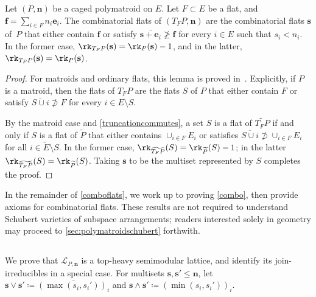 \begin{lemm}\label{truncation}
  Let $(P, \mathbf n)$ be a caged polymatroid on $E$.
  Let $F \subset E$ be a flat, and $\mathbf f = \sum_{i \in F} n_i \mathbf e_i$.
  The combinatorial flats of $(T_F P, \mathbf n)$ are the combinatorial flats $\mathbf s$ of~$P$ that either contain $\mathbf f$ or satisfy  $\overline{\mathbf s +  \mathbf e_i} \not \geq \mathbf f$ for every $i \in E$ such that $s_i < n_i$.
  In the former case, $\rk_{T_FP}(\mathbf s) = \rk_P(\mathbf s) - 1$, and in the latter, $\rk_{T_FP}(\mathbf s) = \rk_P(\mathbf s)$.
\end{lemm}
\begin{proof}
  For matroids and ordinary flats, this lemma is proved in~\cite[Proposition 7.4.9]{B86}. Explicitly, if $P$ is a matroid, then the flats of $T_F P$ are the flats $S$ of $P$ that either contain $F$ or satisfy $\overline{S \cup i} \not \supset F$ for every $i \in E \setminus S$.
  
  By the matroid case and \cref{truncationcommutes}, a set $S$ is a flat of $\widetilde{T_F P}$ if and only if $S$ is a flat of $\widetilde P$ that either contains $\cup_{i \in F} E_i$ or satisfies $\overline{S \cup i} \not \supset \cup_{i \in F} E_i$ for all $i \in \widetilde E \setminus S$. In the former case, $\rk_{\widetilde{T_F P}}(S) = \rk_{\widetilde P}(S) - 1$; in the latter $\rk_{\widetilde{T_FP}}(S) = \rk_{\widetilde P}(S)$.
Taking $\mathbf s$ to be the multiset represented by $S$ completes the proof.
\end{proof}

In the remainder of \cref{comboflats}, we work up to proving \cref{combo}, then provide axioms for combinatorial flats.
These results are not required to understand Schubert varieties of subspace arrangements; readers interested solely in geometry may proceed to  \cref{sec:polymatroidschubert} forthwith.

\subsection{}\label{posetprops}
We prove that $\mathcal L_{P, \mathbf n}$ is a top-heavy semimodular lattice, and identify its join-irreducibles in a special case.
For multisets $\mathbf s, \mathbf s' \leq \mathbf n$, let  $\mathbf s \vee \mathbf s' \coloneqq \overline{(\max(s_i, s_i'))_i}$ and $\mathbf s \wedge \mathbf s' \coloneqq (\min(s_i, s_i'))_i$.

